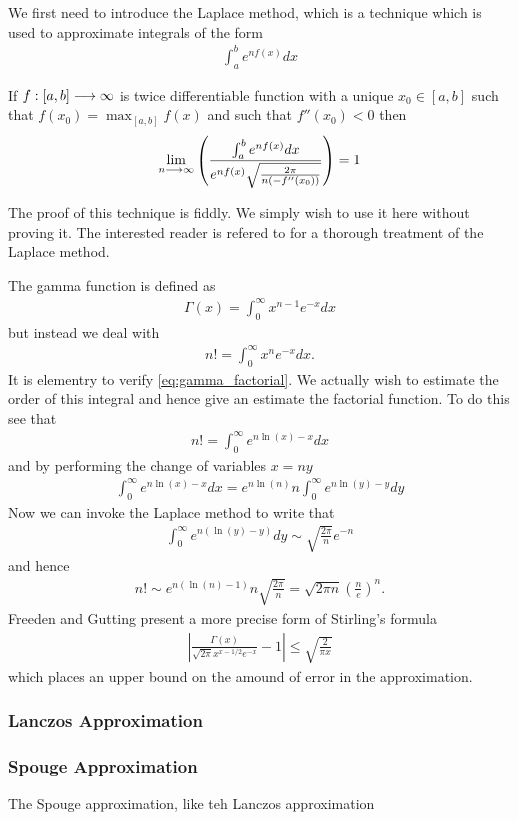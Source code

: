 We first need to introduce the Laplace method, which is a technique which is used to approximate integrals of the form
\begin{align}
    \int_a^b e^{nf(x)} dx
\end{align}
\begin{theorem}
    If $ f : [a, b] \longrightarrow \infty $ is twice differentiable function with a unique $ x_0 \in [a,b] $ such that $ f(x_0) = \max_{[a,b]}f(x) $ and such that $ f''(x_0) < 0 $ then
\begin{align}
    \lim_{n \longrightarrow \infty} \left( \frac{\int_a^b e^{nf(x)}dx}{e^{nf(x)} \sqrt{\frac{2\pi}{n(-f''(x_0))}}} \right) = 1
\end{align}
\end{theorem}
The proof of this technique is fiddly. We simply wish to use it here without proving it. The interested reader is refered to \cite{Lauritzen2009, Avramidi2000} for a thorough treatment of the Laplace method. 

The gamma function is defined as 
\begin{align}
    \Gamma(x) = \int_0^\infty x^{n-1} e^{-x} dx
\end{align}
but instead we deal with 
\begin{align}
    \label{eq:gamma_factorial}
    n! = \int_0^\infty x^n e^{-x} dx.
\end{align}
It is elementry to verify \eqref{eq:gamma_factorial}. We actually wish to estimate the order of this integral and hence give an estimate the factorial function. To do this see that
\begin{align}
    n! = \int_0^\infty e^{n\ln(x)-x} dx
\end{align}
and by performing the change of variables $ x = ny $
\begin{align}
    \int_0^\infty e^{n\ln(x) - x} dx = e^{n\ln(n)}n\int_0^\infty e^{n\ln(y) - y}dy
\end{align}
Now we can invoke the Laplace method to write that
\begin{align}
    \int_0^\infty e^{n(\ln(y)-y)} dy \sim \sqrt{\frac{2\pi}{n}}e^{-n}
\end{align}
and hence
\begin{align}
    n! \sim e^{n(\ln(n) - 1)}n\sqrt{\frac{2\pi}{n}} = \sqrt{2\pi n} \left( \frac{n}{e} \right)^n.
\end{align}
Freeden and Gutting \cite{Freeden2013} present a more precise form of Stirling's formula
\begin{align}
    \left| \frac{\Gamma(x)}{\sqrt{2\pi} x^{x-1/2}e^{-x}} - 1\right| \leq \sqrt{\frac{2}{\pi x}}
\end{align}
which places an upper bound on the amound of error in the approximation.

\subsubsection{Lanczos Approximation}

\subsubsection{Spouge Approximation}
The Spouge approximation, like teh Lanczos approximation 

\clearpage
